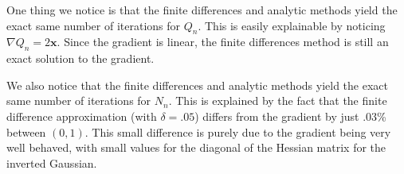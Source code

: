 \documentclass[12pt,letterpaper]{article}
\begin{document}
One thing we notice is that the finite differences and analytic methods yield the exact same number of iterations for $Q_n$. This is easily explainable by noticing $\nabla Q_n = 2\mathbf{x}$. Since the gradient is linear, the finite differences method is still an exact solution to the gradient.

We also notice that the finite differences and analytic methods yield the exact same number of iterations for $N_n$. This is explained by the fact that the finite difference approximation (with $\delta = .05$) differs from the gradient by just .03\% between $(0,1)$. This small difference is purely due to the gradient being very well behaved, with small values for the diagonal of the Hessian matrix for the inverted Gaussian.
\end{document}
